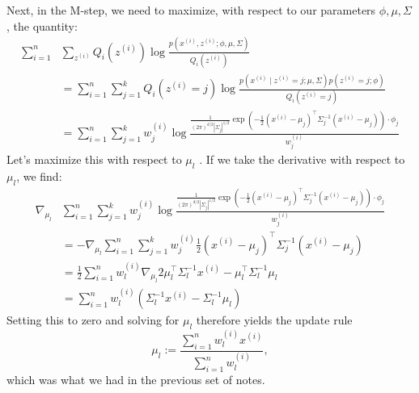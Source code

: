 Next, in the M-step, we need to maximize, with respect to our parameters
$\phi,\mu,\Sigma$, the quantity:
\begin{align*}
    \sum_{i=1}^n &\sum_{z^{(i)}}Q_i(z^{(i)}) \log \frac{p(x^{(i)} ,z^{(i)} ;\phi,\mu,\Sigma)}{Q_i(z^{(i)})}\\
        &= \sum_{i=1}^n \sum_{j=1}^k Q_i (z^{(i)} = j) \log\frac{p(x^{(i)} \mid z^{(i)} = j;\mu,\Sigma)p(z^{(i)} = j;\phi)}{Q_i (z^{(i)} = j)}\\
        &= \sum_{i=1}^n \sum_{j=1}^k w^{(i)}_j \log\frac{\frac{1}{(2\pi)^{d/2} |\Sigma_j|^{1/2}} \exp\left(- \frac 1 2 (x^{(i)} - \mu_j )^\top \Sigma^{-1}_j (x^{(i)} - \mu_j ) \right) \cdot \phi_j}{w^{(i)}_j}    
\end{align*}
Let's maximize this with respect to $\mu_l$ . If we take the derivative with respect
to $\mu_l$, we find:
\begin{align*}
    \nabla_{\mu_l} &\sum_{i=1}^n \sum_{j=1}^k w^{(i)}_j \log\frac{\frac{1}{(2\pi)^{d/2} |\Sigma_j|^{1/2}}\exp \left( -\frac{1}{2} (x^{(i)} - \mu_j)^\top \Sigma^{-1}_j (x^{(i)} - \mu_j) \right) \cdot \phi_j}{w^{(i)}_j}\\
        &= -\nabla_{\mu_l} \sum_{i=1}^n \sum_{j=1}^k w^{(i)}_j \frac 1 2 (x^{(i)} - \mu_j )^\top \Sigma^{-1}_j (x^{(i)} - \mu_j)\\
        &=\frac{1}{2} \sum_{i=1}^n w^{(i)}_l \nabla_{\mu_l} 2\mu^\top_l \Sigma^{-1}_l x^{(i)} - \mu^\top_l \Sigma^{-1}_l \mu_l\\
        &= \sum_{i=1}^n w^{(i)}_l \left( \Sigma^{-1}_l x^{(i)} - \Sigma^{-1}_l \mu_l \right)
\end{align*}
Setting this to zero and solving for $\mu_l$ therefore yields the update rule
\begin{equation*}
    \mu_l := \frac{\sum^n_{i=1} w^{(i)}_l x^{(i)}}{\sum^n_{i=1} w^{(i)}_l},
\end{equation*}
which was what we had in the previous set of notes.

